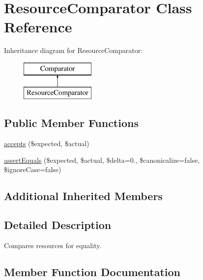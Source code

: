 \hypertarget{class_sebastian_bergmann_1_1_comparator_1_1_resource_comparator}{}\section{Resource\+Comparator Class Reference}
\label{class_sebastian_bergmann_1_1_comparator_1_1_resource_comparator}
Inheritance diagram for Resource\+Comparator\+:\begin{figure}[H]
\begin{center}
\leavevmode
\includegraphics[height=2.000000cm]{class_sebastian_bergmann_1_1_comparator_1_1_resource_comparator}
\end{center}
\end{figure}
\subsection*{Public Member Functions}
\begin{DoxyCompactItemize}
\item 
\mbox{\hyperlink{class_sebastian_bergmann_1_1_comparator_1_1_resource_comparator_ae9bdf0cba02ce3470169280656cdeb84}{accepts}} (\$expected, \$actual)
\item 
\mbox{\hyperlink{class_sebastian_bergmann_1_1_comparator_1_1_resource_comparator_adb3679ea06503114394431cb250ec5a4}{assert\+Equals}} (\$expected, \$actual, \$delta=0., \$canonicalize=false, \$ignore\+Case=false)
\end{DoxyCompactItemize}
\subsection*{Additional Inherited Members}


\subsection{Detailed Description}
Compares resources for equality. 

\subsection{Member Function Documentation}
\mbox{\label{class_sebastian_bergmann_1_1_comparator_1_1_resource_comparator_ae9bdf0cba02ce3470169280656cdeb84}} 
